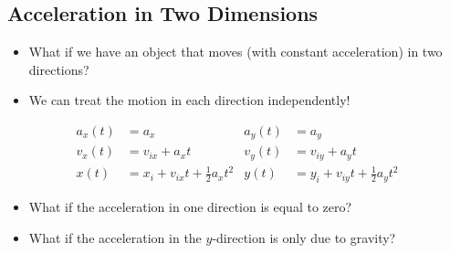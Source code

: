 \documentclass[]{article}
\begin{document}
\begin{PresentSpace}
\vspace{-10pt}
\section*{Acceleration in Two Dimensions}
\vspace{-10pt}
\begin{itemize}
	\item What if we have an object that moves (with constant acceleration) in two directions?
	\item We can treat the motion in each direction independently!
\end{itemize}
\begin{align*}
	a_{x}(t) & = a_{x} & a_{y}(t) & = a_{y} \\
	v_{x}(t) & = v_{ix}+a_{x}t & v_{y}(t) & = v_{iy}+a_{y}t \\
	x(t) & = x_{i}+v_{ix}t+\frac{1}{2}a_{x}t^{2} & y(t) & = y_{i}+v_{iy}t+\frac{1}{2}a_{y}t^{2}
\end{align*}
\begin{itemize}
\item What if the acceleration in one direction is equal to zero?
\item What if the acceleration in the $y$-direction is only due to gravity?
\end{itemize}
\end{PresentSpace}
\newpage
\end{document}
